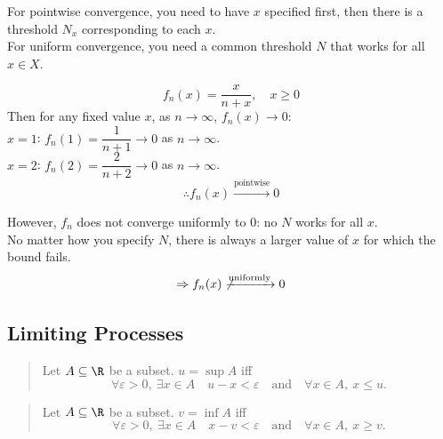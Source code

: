 For pointwise convergence, you need to have $x$ specified first, then there is a threshold $N_x$ corresponding to each $x$.
\\ For uniform convergence, you need a common threshold $N$ that works for all $x \in X$.

\begin{example}
    \[f_n(x) = \frac{x}{n+x}, \quad x\geq 0\]
    Then for any fixed value $x$, as $n\to\infty$, $f_n(x)\to 0$:
    \\ $x=1$: $f_n(1) = \dfrac{1}{n+1} \to 0$ as $n\to\infty$.
    \\ $x=2$: $f_n(2) = \dfrac{2}{n+2} \to 0$ as $n\to\infty$.
    \[\therefore f_n(x) \xrightarrow{\text{pointwise}} 0\]

    However, $f_n$ does not converge uniformly to $0$: no $N$ works for all $x$.
    \\ No matter how you specify $N$, there is always a larger value of $x$ for which the bound fails.
    \[\Rightarrow f_n(x) \not\xrightarrow{\text{uniformly}} 0\]
\end{example}

\subsection{Limiting Processes}

\begin{quote}
    Let $A \subseteq \R$ be a subset. $u = \sup A$ iff
    \[\forall \varepsilon>0,\ \exists x \in A \quad u-x<\varepsilon \quad \text{and} \quad \forall x \in A,\ x \leq u.\]
\end{quote}

\begin{quote}
    Let $A \subseteq \R$ be a subset. $v = \inf A$ iff
    \[\forall \varepsilon>0,\ \exists x \in A \quad x-v<\varepsilon \quad \text{and} \quad \forall x \in A,\ x \geq v.\]
\end{quote}

\begin{center}
\end{center}

